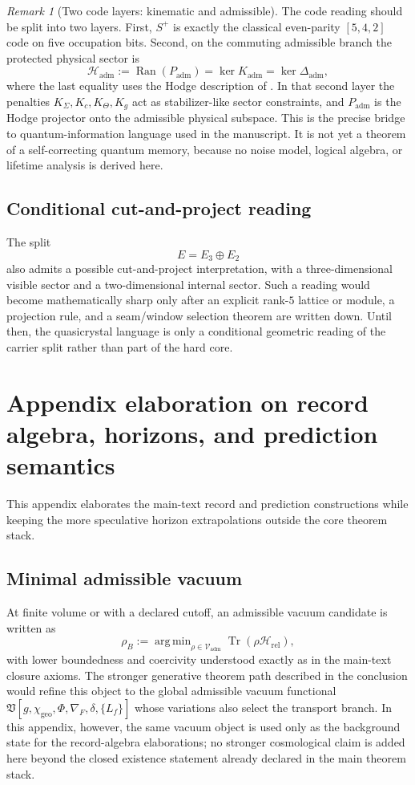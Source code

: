 \documentclass[11pt,a4paper]{article}
\theoremstyle{definition}
\theoremstyle{remark}
\newtheorem*{remark}{Remark}
\DeclareMathOperator{\tr}{Tr}
\DeclareMathOperator{\argmin}{arg\,min}
\newcommand{\Vadm}{\mathcal V_{\mathrm{adm}}}
\newcommand{\Hrel}{\mathcal H_{\mathrm{rel}}}
\newcommand{\Kadm}{K_{\mathrm{adm}}}
\newcommand{\chigeo}{\chi_{\mathrm{geo}}}
\newcommand{\Padm}{P_{\mathrm{adm}}}
\begin{document}
\begin{remark}[Two code layers: kinematic and admissible]
The code reading should be split into two layers. First, $S^+$ is exactly the classical even-parity $[5,4,2]$ code on five occupation bits. Second, on the commuting admissible branch the protected physical sector is
\[
\mathcal H_{\mathrm{adm}}
:=
\operatorname{Ran}(\Padm)
=
\ker \Kadm
=
\ker \Delta_{\mathrm{adm}},
\]
where the last equality uses the Hodge description of . In that second layer the penalties $K_\Sigma,K_c,K_\Theta,K_g$ act as stabilizer-like sector constraints, and $\Padm$ is the Hodge projector onto the admissible physical subspace. This is the precise bridge to quantum-information language used in the manuscript. It is not yet a theorem of a self-correcting quantum memory, because no noise model, logical algebra, or lifetime analysis is derived here.
\end{remark}

\subsection{Conditional cut-and-project reading}

The split
\[
E=E_3\oplus E_2
\]
also admits a possible cut-and-project interpretation, with a three-dimensional visible sector and a two-dimensional internal sector. Such a reading would become mathematically sharp only after an explicit rank-$5$ lattice or module, a projection rule, and a seam/window selection theorem are written down. Until then, the quasicrystal language is only a conditional geometric reading of the carrier split rather than part of the hard core.

\section{Appendix elaboration on record algebra, horizons, and prediction semantics}
\label{app:record}

This appendix elaborates the main-text record and prediction constructions while keeping the more speculative horizon extrapolations outside the core theorem stack.

\subsection{Minimal admissible vacuum}

At finite volume or with a declared cutoff, an admissible vacuum candidate is written as
\[
\rho_B
:=
\argmin_{\rho\in\Vadm}\tr(\rho\Hrel),
\]
with lower boundedness and coercivity understood exactly as in the main-text closure axioms. The stronger generative theorem path described in the conclusion would refine this object to the global admissible vacuum functional $\mathfrak V[g,\chigeo,\Phi,\nabla_F,\delta,\{L_f\}]$ whose variations also select the transport branch. In this appendix, however, the same vacuum object is used only as the background state for the record-algebra elaborations; no stronger cosmological claim is added here beyond the closed existence statement already declared in the main theorem stack.
\end{document}
